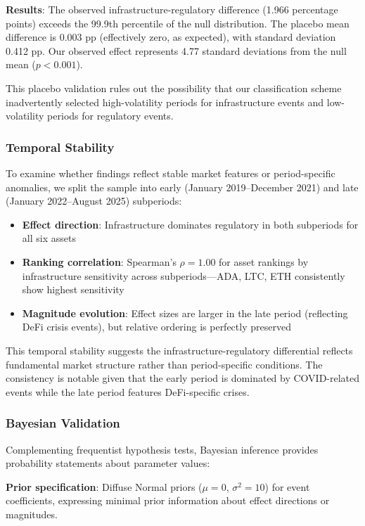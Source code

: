 \documentclass[pdflatex,sn-mathphys-num]{sn-jnl}
\theoremstyle{thmstyleone}
\theoremstyle{thmstyletwo}
\theoremstyle{thmstylethree}
\begin{document}
\textbf{Results}: The observed infrastructure-regulatory difference (1.966 percentage points) exceeds the 99.9th percentile of the null distribution. The placebo mean difference is 0.003 pp (effectively zero, as expected), with standard deviation 0.412 pp. Our observed effect represents 4.77 standard deviations from the null mean ($p < 0.001$).

This placebo validation rules out the possibility that our classification scheme inadvertently selected high-volatility periods for infrastructure events and low-volatility periods for regulatory events.

\subsubsection{Temporal Stability}

To examine whether findings reflect stable market features or period-specific anomalies, we split the sample into early (January 2019--December 2021) and late (January 2022--August 2025) subperiods:

\begin{itemize}[nosep]
\item \textbf{Effect direction}: Infrastructure dominates regulatory in both subperiods for all six assets
\item \textbf{Ranking correlation}: Spearman's $\rho = 1.00$ for asset rankings by infrastructure sensitivity across subperiods---ADA, LTC, ETH consistently show highest sensitivity
\item \textbf{Magnitude evolution}: Effect sizes are larger in the late period (reflecting DeFi crisis events), but relative ordering is perfectly preserved
\end{itemize}

This temporal stability suggests the infrastructure-regulatory differential reflects fundamental market structure rather than period-specific conditions. The consistency is notable given that the early period is dominated by COVID-related events while the late period features DeFi-specific crises.

\subsubsection{Bayesian Validation}

Complementing frequentist hypothesis tests, Bayesian inference provides probability statements about parameter values:

\textbf{Prior specification}: Diffuse Normal priors ($\mu=0$, $\sigma^2=10$) for event coefficients, expressing minimal prior information about effect directions or magnitudes.
\end{document}
